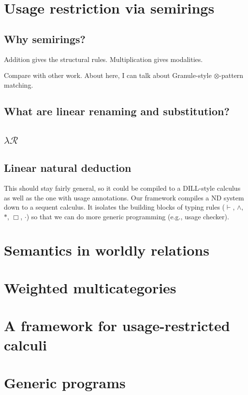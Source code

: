 \documentclass[a4paper,oneside,11pt]{book}
\begin{document}
\chapter{Usage restriction via semirings}
  \section{Why semirings?}
  Addition gives the structural rules.
  Multiplication gives modalities.

  Compare with other work.
  About here, I can talk about Granule-style $\otimes$-pattern matching.

  \section{What are linear renaming and substitution?}
  \section{$\lambda\mathcal{R}$}

  \section{Linear natural deduction}
  This should stay fairly general, so it could be compiled to a DILL-style
  calculus as well as the one with usage annotations.
  Our framework compiles a ND system down to a sequent calculus.
  It isolates the building blocks of typing rules ($\vdash$, $\wedge$, $*$,
  $\Box$, $\cdot$) so that we can do more generic programming (e.g., usage
  checker).

\chapter{Semantics in worldly relations}

\chapter{Weighted multicategories}

\chapter{A framework for usage-restricted calculi}
  

\chapter{Generic programs}
\end{document}
